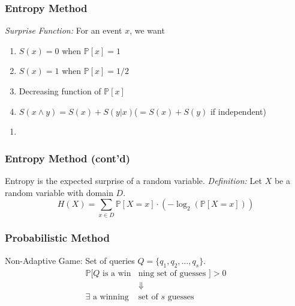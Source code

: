 \documentclass{beamer}
\begin{document}
    \begin{frame}
    \frametitle{Entropy Method}
    \textit{Surprise Function:} For an event $x$, we want
	
    	\begin{enumerate}[label=\arabic*.]
		\item $S(x) = 0$ when $\mathbb{P}[x]=1$
		\item $S(x) = 1$ when $\mathbb{P}[x]=1/2$
		\item Decreasing function of $\mathbb{P}[x]$
		\item $S(x \land y)=S(x)+S(y|x)$\quad ($=S(x)+S(y)$ if independent)\\[2\baselineskip]
	\end{enumerate}

	\begin{enumerate}[label=]
	\item{}
	\end{enumerate}
	\end{frame}
	
	\begin{frame}
	\frametitle{Entropy Method (cont'd)}
	Entropy is the expected surprise of a random variable.
	\textit{Definition:} Let $X$ be a random variable with domain $D$.
			\begin{equation*}
			H(X) = \sum_{x\in D}\mathbb{P}[X=x]\cdot(-\log_2\left(\mathbb{P}[X=x]\right))
			\end{equation*}
    \end{frame}
    
    \begin{frame}
    \frametitle{Probabilistic Method}
    Non-Adaptive Game: Set of queries $Q=\{q_1, q_2, \ldots, q_s\}$.
    	\begin{align*}
		\mathbb{P}[Q\text{ is a win} & \text{ning set of guesses }] > 0 \\
		& \Downarrow \\
		\exists \text{ a winning } & \text{set of $s$ guesses}
		\end{align*}
    \end{frame}

%	
\end{document}
